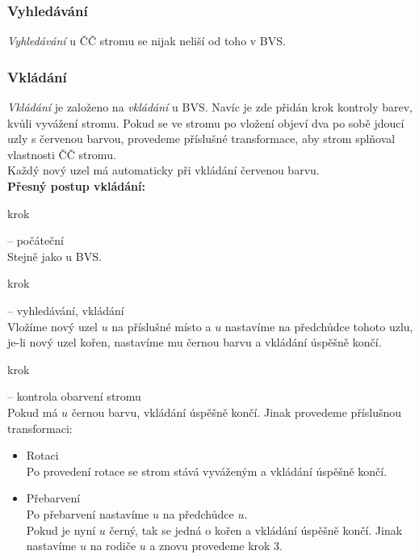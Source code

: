 \documentclass[
  biblatex=false,
  font=serif,
  glossaries=false,
  tables=false,
  theorems=false,
  index
]{kidiplom}
\begin{document}
\subsubsection{Vyhledávání}
\indent\indent \textit{Vyhledávání} u ČČ stromu se nijak neliší od toho v BVS.

\newpage
\subsubsection{Vkládání}
\indent\indent \textit{Vkládání} je založeno na \textit{vkládání} u BVS. Navíc je zde přidán krok kontroly barev, kvůli vyvážení stromu. Pokud se ve stromu po vložení objeví dva po sobě jdoucí uzly s červenou barvou, provedeme příslušné transformace, aby strom splňoval vlastnosti ČČ stromu.\\
\indent Každý nový uzel má automaticky při vkládání červenou barvu.\\

\noindent \textbf{Přesný postup vkládání:}
\begin{enumerate} {\bfseries
\item  krok} -- počáteční \\
Stejně jako u BVS.
{\bfseries\item  krok} -- vyhledávání, vkládání \\
Vložíme nový uzel $u$ na příslušné místo a $u$ nastavíme na předchůdce tohoto uzlu, je-li nový uzel kořen, nastavíme mu černou barvu a vkládání úspěšně končí.
{\bfseries\item  krok} -- kontrola obarvení stromu \\
Pokud má $u$ černou barvu, vkládání úspěšně končí. Jinak provedeme příslušnou transformaci:
\begin{itemize}
\item Rotaci\\
Po provedení rotace se strom stává vyváženým a vkládání úspěšně končí.
\item Přebarvení\\
Po přebarvení nastavíme $u$ na předchůdce $u$.\\
Pokud je nyní $u$ černý, tak se jedná o kořen a vkládání úspěšně končí. Jinak nastavíme $u$ na rodiče $u$ a znovu provedeme krok 3.
\end{itemize}
\end{enumerate}
\end{document}
